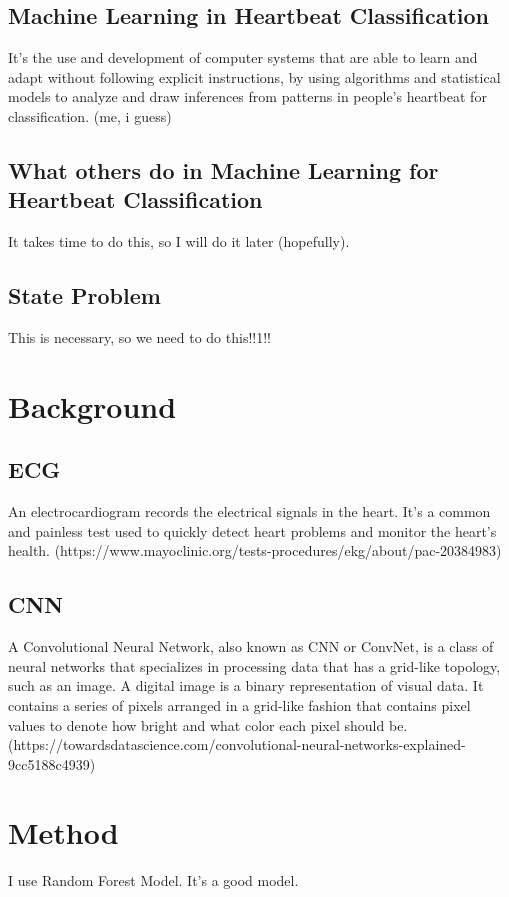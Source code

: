 \documentclass[conference]{IEEEtran}
\begin{document}
\subsection{Machine Learning in Heartbeat Classification}
It's the use and development of computer systems that are able to learn and adapt without following explicit instructions, by using algorithms and statistical models to analyze and draw inferences from patterns in people's heartbeat for classification. (me, i guess)

\subsection{What others do in Machine Learning for Heartbeat Classification}
It takes time to do this, so I will do it later (hopefully).

\subsection{State Problem}
This is necessary, so we need to do this!!1!!

\section{Background}
\subsection{ECG}
An electrocardiogram records the electrical signals in the heart. It's a common and painless test used to quickly detect heart problems and monitor the heart's health. (https://www.mayoclinic.org/tests-procedures/ekg/about/pac-20384983)

\subsection{CNN}
A Convolutional Neural Network, also known as CNN or ConvNet, is a class of neural networks that specializes in processing data that has a grid-like topology, such as an image. A digital image is a binary representation of visual data. It contains a series of pixels arranged in a grid-like fashion that contains pixel values to denote how bright and what color each pixel should be. (https://towardsdatascience.com/convolutional-neural-networks-explained-9cc5188c4939)

\section{Method}
I use Random Forest Model. It's a good model.
\end{document}
